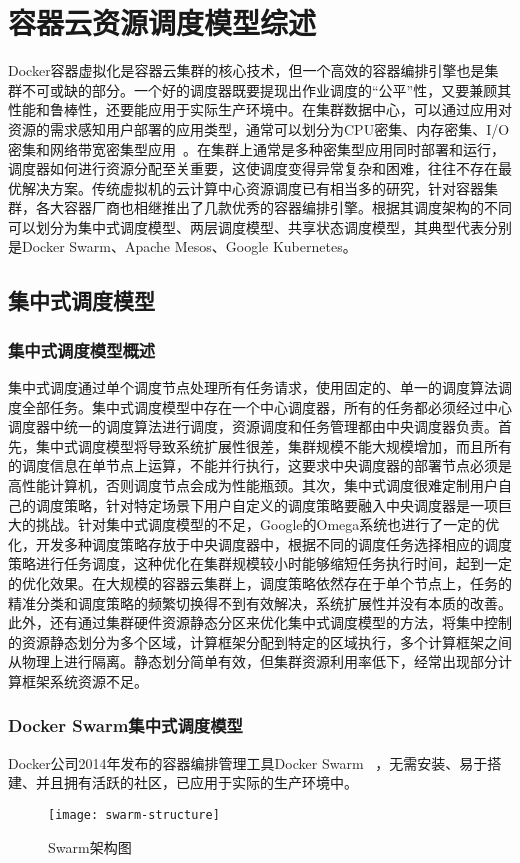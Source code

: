 \chapter{容器云资源调度模型综述}
Docker容器虚拟化是容器云集群的核心技术，但一个高效的容器编排引擎也是集群不可或缺的部分。一个好的调度器既要提现出作业调度的“公平”性，又要兼顾其性能和鲁棒性，还要能应用于实际生产环境中。在集群数据中心，可以通过应用对资源的需求感知用户部署的应用类型，通常可以划分为CPU密集、内存密集、I/O密集和网络带宽密集型应用~\cite{Peng2016Research,Shuangke2017SchedulingStrategy}。在集群上通常是多种密集型应用同时部署和运行，调度器如何进行资源分配至关重要，这使调度变得异常复杂和困难，往往不存在最优解决方案。传统虚拟机的云计算中心资源调度已有相当多的研究，针对容器集群，各大容器厂商也相继推出了几款优秀的容器编排引擎。根据其调度架构的不同可以划分为集中式调度模型、两层调度模型、共享状态调度模型，其典型代表分别是Docker Swarm、Apache Mesos、Google Kubernetes。

\section{集中式调度模型}
\subsection{集中式调度模型概述}
集中式调度通过单个调度节点处理所有任务请求，使用固定的、单一的调度算法调度全部任务。集中式调度模型中存在一个中心调度器，所有的任务都必须经过中心调度器中统一的调度算法进行调度，资源调度和任务管理都由中央调度器负责。首先，集中式调度模型将导致系统扩展性很差，集群规模不能大规模增加，而且所有的调度信息在单节点上运算，不能并行执行，这要求中央调度器的部署节点必须是高性能计算机，否则调度节点会成为性能瓶颈。其次，集中式调度很难定制用户自己的调度策略，针对特定场景下用户自定义的调度策略要融入中央调度器是一项巨大的挑战。针对集中式调度模型的不足，Google的Omega系统也进行了一定的优化，开发多种调度策略存放于中央调度器中，根据不同的调度任务选择相应的调度策略进行任务调度，这种优化在集群规模较小时能够缩短任务执行时间，起到一定的优化效果。在大规模的容器云集群上，调度策略依然存在于单个节点上，任务的精准分类和调度策略的频繁切换得不到有效解决，系统扩展性并没有本质的改善。此外，还有通过集群硬件资源静态分区来优化集中式调度模型的方法，将集中控制的资源静态划分为多个区域，计算框架分配到特定的区域执行，多个计算框架之间从物理上进行隔离。静态划分简单有效，但集群资源利用率低下，经常出现部分计算框架系统资源不足。

\subsection{Docker Swarm集中式调度模型}
Docker公司2014年发布的容器编排管理工具Docker Swarm~\cite{Jansen2016Employing,Naik2016Building} ，无需安装、易于搭建、并且拥有活跃的社区，已应用于实际的生产环境中。
\begin{figure}[H] %
	\centering
	\texttt{[image: swarm-structure]}
	\caption{Swarm架构图\cite{Naik2016Building} }
\end{figure}

